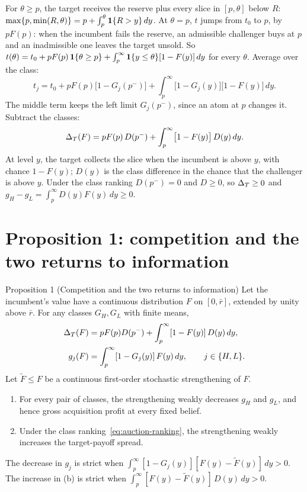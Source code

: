 For \(\theta\ge p\), the target receives the reserve plus every slice in \([p,\theta]\) below \(R\): \(\max\{p,\min(R,\theta)\}=p+\int_p^\theta\mathbf{1}\{R>y\}\,dy\).
At \(\theta=p\), \(t\) jumps from \(t_0\) to \(p\), by \(pF(p)\): when the incumbent fails the reserve, an admissible challenger buys at \(p\) and an inadmissible one leaves the target unsold. So \(t(\theta)=t_0+pF(p)\,\mathbf{1}\{\theta\ge p\}+\int_p^\infty\mathbf{1}\{y\le\theta\}[1-F(y)]\,dy\) for every \(\theta\). Average over the class:
\[
t_j=t_0+pF(p)\bigl[1-G_j(p^-)\bigr]+\int_p^\infty\bigl[1-G_j(y)\bigr]\bigl[1-F(y)\bigr]\,dy.
\]
The middle term keeps the left limit \(G_j(p^-)\), since an atom at \(p\) changes it. Subtract the classes:
\begin{equation}\label{eq:auction-spread}
\Delta_T(F)=pF(p)\,D(p^-)+\int_p^\infty\bigl[1-F(y)\bigr]\,D(y)\,dy.
\end{equation}
At level \(y\), the target collects the slice when the incumbent is above \(y\), with chance \(1-F(y)\); \(D(y)\) is the class difference in the chance that the challenger is above \(y\).
Under the class ranking \(D(p^-)=0\) and \(D\ge0\), so \(\Delta_T\ge0\) and \(g_H-g_L=\int_p^\infty D(y)F(y)\,dy\ge0\).

\section{Proposition 1: competition and the two returns to information}\label{sec:auction-prop1}

\begin{paperresult}{Proposition 1 (Competition and the two returns to information)}
Let the incumbent's value have a continuous distribution \(F\) on \([0,\bar r]\), extended by unity above
\(\bar r\). For any classes \(G_H,G_L\) with finite means,
\[
\begin{aligned}
\Delta_T(F)&=pF(p)D(p^-)+\int_p^\infty[1-F(y)]\,D(y)\,dy,\\
g_j(F)&=\int_p^\infty[1-G_j(y)]\,F(y)\,dy,\qquad j\in\{H,L\}.
\end{aligned}
\]
Let \(\tilde F\le F\) be a continuous first-order stochastic strengthening of \(F\).
\begin{enumerate}[label=(\alph*),leftmargin=2em]
\item For every pair of classes, the strengthening weakly decreases \(g_H\) and \(g_L\), and hence gross
acquisition profit at every fixed belief.
\item Under the class ranking~\eqref{eq:auction-ranking}, the strengthening weakly increases the target-payoff
spread.
\end{enumerate}
The decrease in \(g_j\) is strict when \(\int_p^\infty[1-G_j(y)][F(y)-\tilde F(y)]\,dy>0\). The increase in (b) is
strict when \(\int_p^\infty[F(y)-\tilde F(y)]\,D(y)\,dy>0\).
\end{paperresult}

